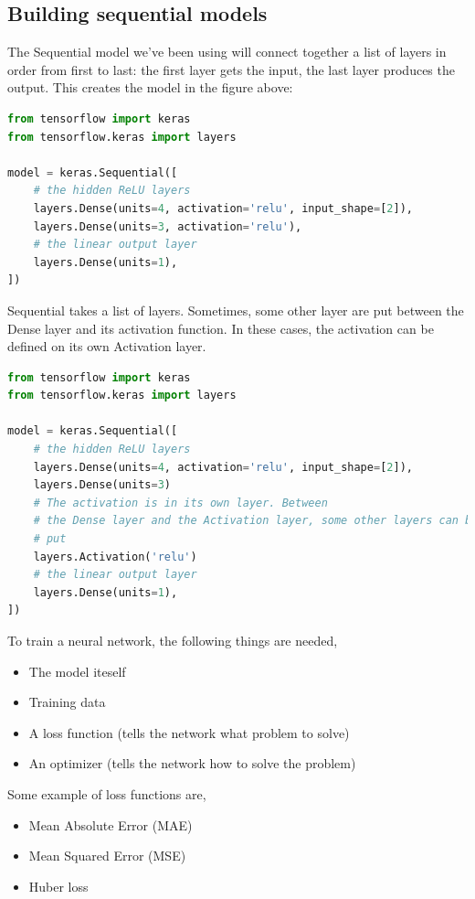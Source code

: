 \subsection{Building sequential models}
The Sequential model we've been using will connect together a list of layers
in order from first to last: the first layer gets the input, the last layer
produces the output. This creates the model in the figure above:

\begin{lstlisting}[language=Python]
from tensorflow import keras
from tensorflow.keras import layers

model = keras.Sequential([
    # the hidden ReLU layers
    layers.Dense(units=4, activation='relu', input_shape=[2]),
    layers.Dense(units=3, activation='relu'),
    # the linear output layer 
    layers.Dense(units=1),
])
\end{lstlisting}

\noindent Sequential takes a list of layers. Sometimes, some other
layer are put between the Dense layer and its activation function. In
these cases, the activation can be defined on its own Activation layer.

\begin{lstlisting}[language=Python]
from tensorflow import keras
from tensorflow.keras import layers

model = keras.Sequential([
    # the hidden ReLU layers
    layers.Dense(units=4, activation='relu', input_shape=[2]),
    layers.Dense(units=3)
    # The activation is in its own layer. Between
    # the Dense layer and the Activation layer, some other layers can be 
    # put
    layers.Activation('relu')
    # the linear output layer 
    layers.Dense(units=1),
])
\end{lstlisting}

\noindent To train a neural network, the following things are needed,
\begin{itemize}
	\item The model iteself
	\item Training data
	\item A loss function (tells the network what problem to solve)
	\item An optimizer (tells the network how to solve the problem)
\end{itemize}

\noindent Some example of loss functions are,
\begin{itemize}
	\item Mean Absolute Error (MAE)
	\item Mean Squared Error (MSE)
	\item Huber loss
\end{itemize}

